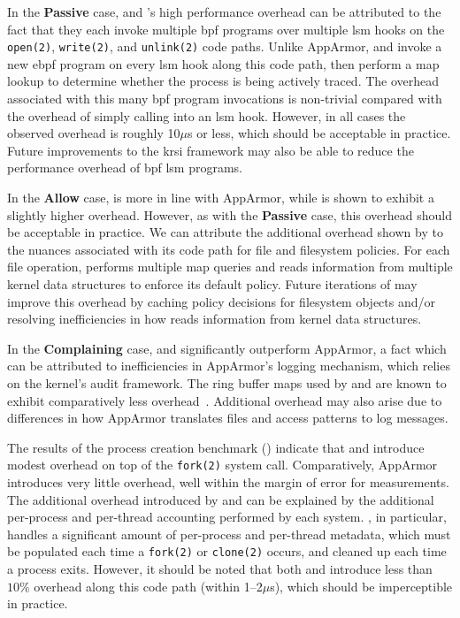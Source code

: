 In the \textbf{Passive} case, \bpfbox{} and \bpfcontain{}'s high performance overhead can
be attributed to the fact that they each invoke multiple \gls{bpf} programs over multiple
\gls{lsm} hooks on the \texttt{open(2)}, \texttt{write(2)}, and \texttt{unlink(2)} code
paths. Unlike AppArmor, \bpfbox{} and \bpfcontain{} invoke a new \gls{ebpf} program on
every \gls{lsm} hook along this code path, then perform a map lookup to determine whether
the process is being actively traced. The overhead associated with this many \gls{bpf}
program invocations is non-trivial compared with the overhead of simply calling into an
\gls{lsm} hook.  However, in all cases the observed overhead is roughly 10$\mu$s or less,
which should be acceptable in practice. Future improvements to the \gls{krsi} framework
may also be able to reduce the performance overhead of \gls{bpf} \gls{lsm} programs.

In the \textbf{Allow} case, \bpfbox{} is more in line with AppArmor, while \bpfcontain{}
is shown to exhibit a slightly higher overhead. However, as with the \textbf{Passive}
case, this overhead should be acceptable in practice. We can attribute the additional
overhead shown by \bpfcontain{} to the nuances associated with its code path for file and
filesystem policies. For each file operation, \bpfcontain{} performs multiple map queries
and reads information from multiple kernel data structures to enforce its default policy.
Future iterations of \bpfcontain{} may improve this overhead by caching policy decisions
for filesystem objects and/or resolving inefficiencies in how \bpfcontain{} reads
information from kernel data structures.

In the \textbf{Complaining} case, \bpfbox{} and \bpfcontain{} significantly outperform
AppArmor, a fact which can be attributed to inefficiencies in AppArmor's logging
mechanism, which relies on the kernel's audit framework. The ring buffer maps used by
\bpfbox{} and \bpfcontain{} are known to exhibit comparatively less overhead~.
Additional overhead may also arise due to differences in how AppArmor translates files and
access patterns to log messages.

The results of the process creation benchmark () indicate
that \bpfbox{} and \bpfcontain{} introduce modest overhead on top of the \texttt{fork(2)}
system call.  Comparatively, AppArmor introduces very little overhead, well within the
margin of error for measurements. The additional overhead introduced by \bpfbox{} and
\bpfcontain{} can be explained by the additional per-process and per-thread accounting
performed by each system. \bpfcontain{}, in particular, handles a significant amount of
per-process and per-thread metadata, which must be populated each time a \texttt{fork(2)}
or \texttt{clone(2)} occurs, and cleaned up each time a process exits. However, it should
be noted that both \bpfbox{} and \bpfcontain{} introduce less than $10\%$ overhead along
this code path (within 1--2$\mu$s), which should be imperceptible in practice.

